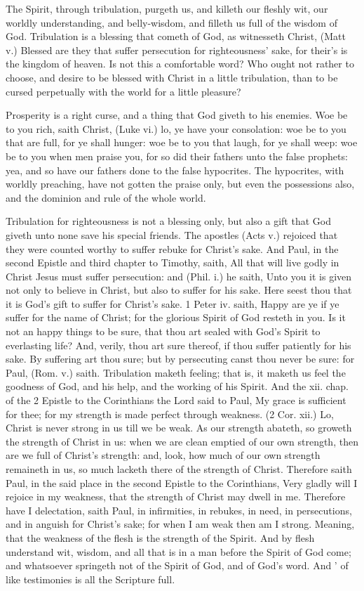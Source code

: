 The Spirit, through tribulation, purgeth us, 
and killeth our fleshly wit, our worldly understanding,
and belly-wisdom, and filleth us full of 
the wisdom of God. Tribulation is a blessing 
that cometh of God, as witnesseth Christ, (Matt v.) 
Blessed are they that suffer persecution for 
righteousness' sake, for their's is the kingdom of 
heaven. Is not this a comfortable word? Who 
ought not rather to choose, and desire to be blessed 
with Christ in a little tribulation, than to be cursed 
perpetually with the world for a little pleasure? 

Prosperity is a right curse, and a thing that 
God giveth to his enemies. Woe be to you 
rich, saith Christ, (Luke vi.) lo, ye have your 
consolation: woe be to you that are full, for ye 
shall hunger: woe be to you that laugh, for ye 
shall weep: woe be to you when men praise you, 
for so did their fathers unto the false prophets: yea, 
and so have our fathers done to the false hypocrites. 
The hypocrites, with worldly preaching, have not 
gotten the praise only, but even the possessions 
also, and the dominion and rule of the whole world. 

Tribulation for righteousness is not a blessing 
only, but also a gift that God giveth unto none 
save his special friends. The apostles (Acts v.) 
rejoiced that they were counted worthy to suffer 
rebuke for Christ's sake. And Paul, in the second 
Epistle and third chapter to Timothy, saith, All 
that will live godly in Christ Jesus must suffer 
persecution: and (Phil. i.) he saith, Unto you it is 
given not only to believe in Christ, but also to suffer 
for his sake. Here seest thou that it is God's gift 
to suffer for Christ's sake. 1 Peter iv. saith, Happy 
are ye if ye suffer for the name of Christ; for the 
glorious Spirit of God resteth in you. Is it not an 
happy things to be sure, that thou art sealed with 
God's Spirit to everlasting life? And, verily, thou 
art sure thereof, if thou suffer patiently for his 
sake. By suffering art thou sure; but by persecuting
canst thou never be sure: for Paul, 
(Rom. v.) saith. Tribulation maketh feeling; that 
is, it maketh us feel the goodness of God, and 
his help, and the working of his Spirit. And the
xii. chap. of the 2 Epistle to the Corinthians the
Lord said to Paul, My grace is sufficient for thee;
for my strength is made perfect through weakness.
(2 Cor. xii.) Lo, Christ is never strong in 
us till we be weak. As our strength abateth, so 
groweth the strength of Christ in us: when we 
are clean emptied of our own strength, then are
we full of Christ's strength: and, look, how much
of our own strength remaineth in us, so much 
lacketh there of the strength of Christ. Therefore
saith Paul, in the said place in the second 
Epistle to the Corinthians, Very gladly will I 
rejoice in my weakness, that the strength of 
Christ may dwell in me. Therefore have I delectation,
saith Paul, in infirmities, in rebukes, in 
need, in persecutions, and in anguish for Christ's 
sake; for when I am weak then am I strong. 
Meaning, that the weakness of the flesh is the 
strength of the Spirit. And by flesh understand
wit, wisdom, and all that is in a man before the 
Spirit of God come; and whatsoever springeth 
not of the Spirit of God, and of God's word. And ' 
of like testimonies is all the Scripture full.

